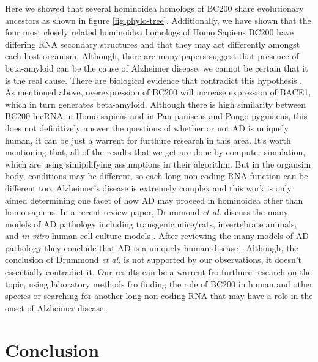 \documentclass[conference, 11pt]{IEEEtran}
\begin{document}
Here we showed that several hominoidea homologs of BC200 share evolutionary ancestors as shown in figure \ref{fig:phylo-tree}. Additionally, we have shown that the four most closely related hominoidea homologs of Homo Sapiens BC200 have differing RNA secondary structures and that they may act differently amongst each host organism. Although, there are many papers suggest that presence of beta-amyloid can be the cause of Alzheimer disease, we cannot be certain that it is the real cause. There are biological evidence that contradict this hypothesis \cite{selkoe2016amyloid}. As mentioned above, overexpression of BC200 will increase expression of BACE1, which in turn generates beta-amyloid. Although there is high similarity between BC200 lncRNA in Homo sapiens and in Pan paniscus and Pongo pygmaeus, this does not definitively answer the questions of whether or not AD is uniquely human, it can be just a warrent for furthure research in this area. It's worth mentioning that, all of the results that we get are done by computer simulation, which are using simipilifying assumptions in their algorithm. But in the organsim body, conditions may be different, so each long non-coding RNA function can be different too. Alzheimer’s disease is extremely complex and this work is only aimed determining one facet of how AD may proceed in hominoidea other than homo sapiens. In a recent review paper, Drummond \emph{et al.} discuss the many models of AD pathology including transgenic mice/rats, invertebrate animals, and \emph{in vitro} human cell culture models \cite{drummond2017alzheimer}. After reviewing the many models of AD pathology they conclude that AD is a uniquely human disease \cite{drummond2017alzheimer}. Although, the conclusion of Drummond \emph{et al.} is not supported by our observations, it doesn't essentially contradict it. Our results can be a warrent fro furthure research on the topic, using laboratory methods fro finding the role of BC200 in human and other species or searching for another long non-coding RNA that may have a role in the onset of Alzheimer disease.

\section{Conclusion}\label{sec:conclusion}
\end{document}
